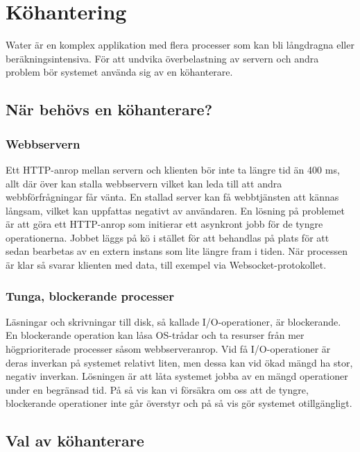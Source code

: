 \section{Köhantering}
\label{section:kohanterare}

Water är en komplex applikation med flera processer som kan bli långdragna eller beräkningsintensiva. För att undvika överbelastning av servern och andra problem bör systemet använda sig av en köhanterare.

\subsection{När behövs en köhanterare?}

\subsubsection{Webbservern}

Ett HTTP-anrop mellan servern och klienten bör inte ta längre tid än 400 ms, allt där över kan stalla webbservern vilket kan leda till att andra webbförfrågningar får vänta. En stallad server kan få webbtjänsten att kännas långsam, vilket kan uppfattas negativt av användaren.
En lösning på problemet är att göra ett HTTP-anrop som initierar ett asynkront jobb för de tyngre operationerna. Jobbet läggs på kö i stället för att behandlas på plats för att sedan bearbetas av en extern instans som lite längre fram i tiden. När processen är klar så svarar klienten med data, till exempel via Websocket-protokollet.

\subsubsection{Tunga, blockerande processer}

Läsningar och skrivningar till disk, så kallade I/O-operationer, är blockerande. En blockerande operation kan låsa OS-trådar och ta resurser från mer högprioriterade processer såsom webbserveranrop.
Vid få I/O-operationer är deras inverkan på systemet relativt liten, men dessa kan vid ökad mängd ha stor, negativ inverkan.
Lösningen är att låta systemet jobba av en mängd operationer under en begränsad tid. På så vis kan vi försäkra om oss att de tyngre, blockerande operationer inte går överstyr och på så vis gör systemet otillgängligt.

\subsection{Val av köhanterare}

